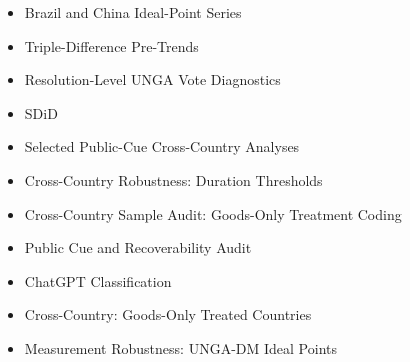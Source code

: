 \documentclass[11pt]{article}
\begin{document}
\begin{itemize}

\item Brazil and China Ideal-Point Series

\item Triple-Difference Pre-Trends

\item Resolution-Level UNGA Vote Diagnostics

\item SDiD

\item Selected Public-Cue Cross-Country Analyses

\item Cross-Country Robustness: Duration Thresholds

\item Cross-Country Sample Audit: Goods-Only Treatment Coding

\item Public Cue and Recoverability Audit

\item ChatGPT Classification

\item Cross-Country: Goods-Only Treated Countries

\item Measurement Robustness: UNGA-DM Ideal Points

\end{itemize}
\end{document}
